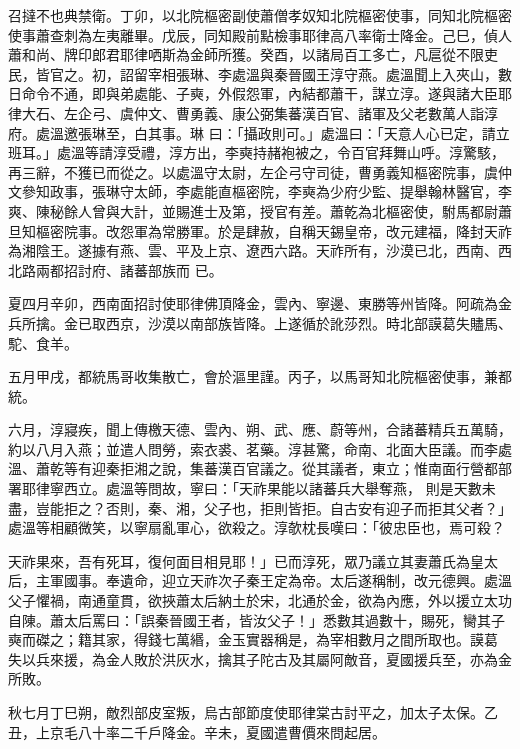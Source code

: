 \begin{pinyinscope}
 召撻不也典禁衛。丁卯，以北院樞密副使蕭僧孝奴知北院樞密使事，同知北院樞密使事蕭查刺為左夷離畢。戊辰，同知殿前點檢事耶律高八率衛士降金。己巳，偵人蕭和尚、牌印郎君耶律哂斯為金師所獲。癸酉，以諸局百工多亡，凡扈從不限吏民，皆官之。初，詔留宰相張琳、李處溫與秦晉國王淳守燕。處溫聞上入夾山，數日命令不通，即與弟處能、子奭，外假怨軍，內結都蕭干，謀立淳。遂與諸大臣耶律大石、左企弓、虞仲文、曹勇義、康公弼集蕃漢百官、諸軍及父老數萬人詣淳府。處溫邀張琳至，白其事。琳
 曰：「攝政則可。」處溫曰：「天意人心已定，請立班耳。」處溫等請淳受禮，淳方出，李奭持赭袍被之，令百官拜舞山呼。淳驚駭，再三辭，不獲已而從之。以處溫守太尉，左企弓守司徒，曹勇義知樞密院事，虞仲文參知政事，張琳守太師，李處能直樞密院，李奭為少府少監、提舉翰林醫官，李爽、陳秘餘人曾與大計，並賜進士及第，授官有差。蕭乾為北樞密使，駙馬都尉蕭旦知樞密院事。改怨軍為常勝軍。於是肆赦，自稱天錫皇帝，改元建福，降封天祚為湘陰王。遂據有燕、雲、平及上京、遼西六路。天祚所有，沙漠已北，西南、西北路兩都招討府、諸蕃部族而
 已。



 夏四月辛卯，西南面招討使耶律佛頂降金，雲內、寧邊、東勝等州皆降。阿疏為金兵所擒。金已取西京，沙漠以南部族皆降。上遂循於訛莎烈。時北部謨葛失贐馬、駝、食羊。



 五月甲戌，都統馬哥收集散亡，會於漚里謹。丙子，以馬哥知北院樞密使事，兼都統。



 六月，淳寢疾，聞上傳檄天德、雲內、朔、武、應、蔚等州，合諸蕃精兵五萬騎，約以八月入燕；並遣人問勞，索衣裘、茗藥。淳甚驚，命南、北面大臣議。而李處溫、蕭乾等有迎秦拒湘之說，集蕃漢百官議之。從其議者，東立；惟南面行營都部署耶律寧西立。處溫等問故，寧曰：「天祚果能以諸蕃兵大舉奪燕，
 則是天數未盡，豈能拒之？否則，秦、湘，父子也，拒則皆拒。自古安有迎子而拒其父者？」處溫等相顧微笑，以寧扇亂軍心，欲殺之。淳欹枕長嘆曰：「彼忠臣也，焉可殺？



 天祚果來，吾有死耳，復何面目相見耶！」已而淳死，眾乃議立其妻蕭氏為皇太后，主軍國事。奉遺命，迎立天祚次子秦王定為帝。太后遂稱制，改元德興。處溫父子懼禍，南通童貫，欲挾蕭太后納土於宋，北通於金，欲為內應，外以援立太功自陳。蕭太后罵曰：「誤秦晉國王者，皆汝父子！」悉數其過數十，賜死，臠其子奭而磔之；籍其家，得錢七萬緡，金玉實器稱是，為宰相數月之間所取也。謨葛
 失以兵來援，為金人敗於洪灰水，擒其子陀古及其屬阿敵音，夏國援兵至，亦為金所敗。



 秋七月丁巳朔，敵烈部皮室叛，烏古部節度使耶律棠古討平之，加太子太保。乙丑，上京毛八十率二千戶降金。辛未，夏國遣曹價來問起居。




\end{pinyinscope}
